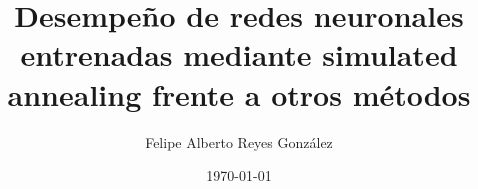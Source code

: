 \documentclass[informe]{tesis-usach}
\title{Desempeño de redes neuronales entrenadas mediante simulated annealing frente a otros métodos}
\author{Felipe Alberto Reyes González}
\date{\today}
\begin{document}
\renewcommand{\contentsname}{Tabla de contenido}
\renewcommand{\refname}{Bibliografía}
\renewcommand{\appendixname}{Apéndice}
\renewcommand{\appendixtocname}{Apéndices}
\renewcommand{\appendixpagename}{Apéndices}
\renewcommand{\tablename}{Tabla}


\maketitle

%
\tableofcontents
\newpage






%


\newpage
\bibliografia


% 


%
%

\end{document}
